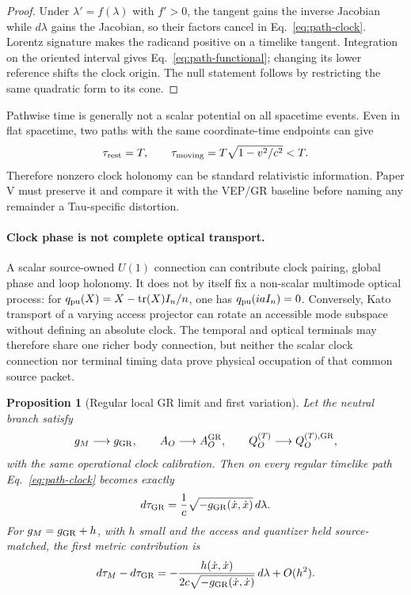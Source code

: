 \documentclass[11pt]{article}
\newtheorem{proposition}{Proposition}
\begin{document}
\begin{proof}
Under \(\lambda'=f(\lambda)\) with \(f'>0\), the tangent gains the inverse
Jacobian while \(d\lambda\) gains the Jacobian, so their factors cancel in
Eq.~\eqref{eq:path-clock}. Lorentz signature makes the radicand positive on a
timelike tangent. Integration on the oriented interval gives
Eq.~\eqref{eq:path-functional}; changing its lower reference shifts the clock
origin. The null statement follows by restricting the same quadratic form to
its cone.
\end{proof}

Pathwise time is generally not a scalar potential on all spacetime events.
Even in flat spacetime, two paths with the same coordinate-time endpoints can
give
\begin{equation}
 \tau_{\rm rest}=T,
 \qquad
 \tau_{\rm moving}=T\sqrt{1-v^2/c^2}<T.
 \label{eq:differential-aging}
\end{equation}
Therefore nonzero clock holonomy can be standard relativistic information.
Paper V must preserve it and compare it with the VEP/GR baseline before naming
any remainder a Tau-specific distortion.

\paragraph{Clock phase is not complete optical transport.}
A scalar source-owned \(U(1)\) connection can contribute clock pairing,
global phase and loop holonomy.  It does not by itself fix a non-scalar
multimode optical process: for
\(q_{\rm pu}(X)=X-\operatorname{tr}(X)I_n/n\), one has
\(q_{\rm pu}(iaI_n)=0\).  Conversely, Kato transport of a varying access
projector can rotate an accessible mode subspace without defining an absolute
clock.  The temporal and optical terminals may therefore share one richer
body connection, but neither the scalar clock connection nor terminal timing
data prove physical occupation of that common source packet.

\begin{proposition}[Regular local GR limit and first variation]
Let the neutral branch satisfy
\begin{equation}
 g_M\longrightarrow g_{\rm GR},\qquad
 A_O\longrightarrow A_O^{\rm GR},\qquad
 Q_O^{(T)}\longrightarrow Q_O^{(T),\rm GR},
 \label{eq:gr-limit-data}
\end{equation}
with the same operational clock calibration. Then on every regular timelike
path Eq.~\eqref{eq:path-clock} becomes exactly
\begin{equation}
 d\tau_{\rm GR}=\frac{1}{c}
 \sqrt{-g_{\rm GR}(\dot x,\dot x)}\,d\lambda.
 \label{eq:gr-proper-time}
\end{equation}
For \(g_M=g_{\rm GR}+h\), with \(h\) small and the access and quantizer held
source-matched, the first metric contribution is
\begin{equation}
 d\tau_M-d\tau_{\rm GR}
 =-\frac{h(\dot x,\dot x)}
 {2c\sqrt{-g_{\rm GR}(\dot x,\dot x)}}\,d\lambda
 +O(h^2).
 \label{eq:clock-first-variation}
\end{equation}
\end{proposition}
\end{document}
